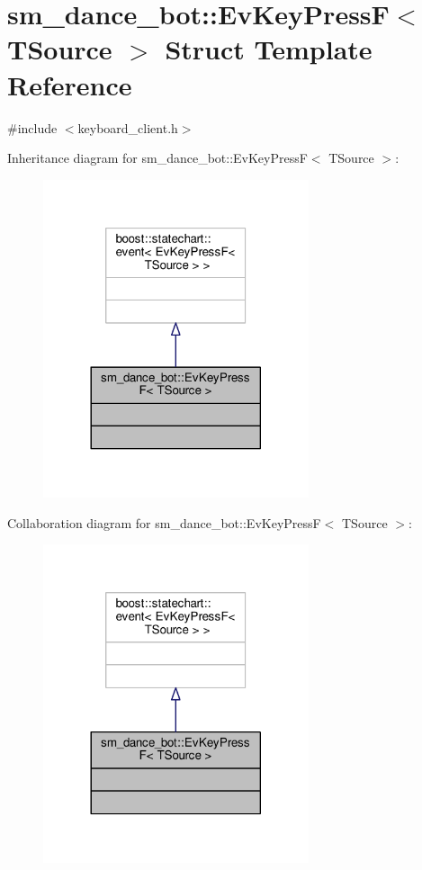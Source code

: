 \hypertarget{structsm__dance__bot_1_1EvKeyPressF}{}\section{sm\+\_\+dance\+\_\+bot\+:\+:Ev\+Key\+PressF$<$ T\+Source $>$ Struct Template Reference}
\label{structsm__dance__bot_1_1EvKeyPressF}


{\ttfamily \#include $<$keyboard\+\_\+client.\+h$>$}



Inheritance diagram for sm\+\_\+dance\+\_\+bot\+:\+:Ev\+Key\+PressF$<$ T\+Source $>$\+:
\nopagebreak
\begin{figure}[H]
\begin{center}
\leavevmode
\includegraphics[width=221pt]{structsm__dance__bot_1_1EvKeyPressF__inherit__graph}
\end{center}
\end{figure}


Collaboration diagram for sm\+\_\+dance\+\_\+bot\+:\+:Ev\+Key\+PressF$<$ T\+Source $>$\+:
\nopagebreak
\begin{figure}[H]
\begin{center}
\leavevmode
\includegraphics[width=221pt]{structsm__dance__bot_1_1EvKeyPressF__coll__graph}
\end{center}
\end{figure}


